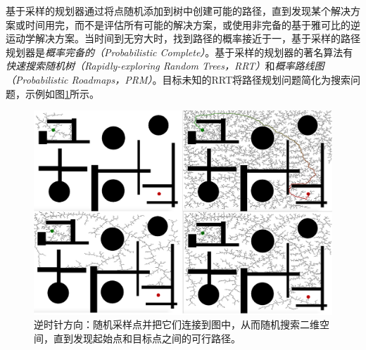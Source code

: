 基于采样的规划器通过将点随机添加到树中创建可能的路径，直到发现某个解决方案或时间用完，而不是评估所有可能的解决方案，或使用非完备的基于雅可比的逆运动学解决方案。当时间到无穷大时，找到路径的概率接近于一，基于采样的路径规划器是\emph{概率完备的（Probabilistic Complete）}。基于采样的规划器的著名算法有\emph{快速搜索随机树（Rapidly-exploring Random Trees，RRT）}\cite{lavalle1998rapidly}和\emph{概率路线图（Probabilistic Roadmaps，PRM）}\cite{kavraki1996probabilistic}。目标未知的RRT将路径规划问题简化为搜索问题，示例如图\ref{fig:rrt}所示。

\begin{figure}
\centering
\includegraphics[width=\textwidth]{figs/irrt}
\caption{逆时针方向：随机采样点并把它们连接到图中，从而随机搜索二维空间，直到发现起始点和目标点之间的可行路径。}
\label{fig:rrt}
\end{figure}


